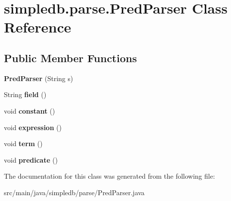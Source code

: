 \hypertarget{classsimpledb_1_1parse_1_1PredParser}{}\section{simpledb.\+parse.\+Pred\+Parser Class Reference}
\label{classsimpledb_1_1parse_1_1PredParser}
\subsection*{Public Member Functions}
\begin{DoxyCompactItemize}
\item 
\mbox{\label{classsimpledb_1_1parse_1_1PredParser_a598007128ae87a58f4e6744808a04a01}} 
{\bfseries Pred\+Parser} (String s)
\item 
\mbox{\label{classsimpledb_1_1parse_1_1PredParser_acb7dcc8b0d94959b08477f7ab98ddbf4}} 
String {\bfseries field} ()
\item 
\mbox{\label{classsimpledb_1_1parse_1_1PredParser_a22bdeae1ceaf0520ebd122bfe2d277ef}} 
void {\bfseries constant} ()
\item 
\mbox{\label{classsimpledb_1_1parse_1_1PredParser_a7c952226635a63e793ac7c4a7f4fcc12}} 
void {\bfseries expression} ()
\item 
\mbox{\label{classsimpledb_1_1parse_1_1PredParser_a84bcd519f1ae6b46db460c2df53fd824}} 
void {\bfseries term} ()
\item 
\mbox{\label{classsimpledb_1_1parse_1_1PredParser_a4331d34cce14762892901454af1321d8}} 
void {\bfseries predicate} ()
\end{DoxyCompactItemize}


The documentation for this class was generated from the following file\+:\begin{DoxyCompactItemize}
\item 
src/main/java/simpledb/parse/Pred\+Parser.\+java\end{DoxyCompactItemize}
